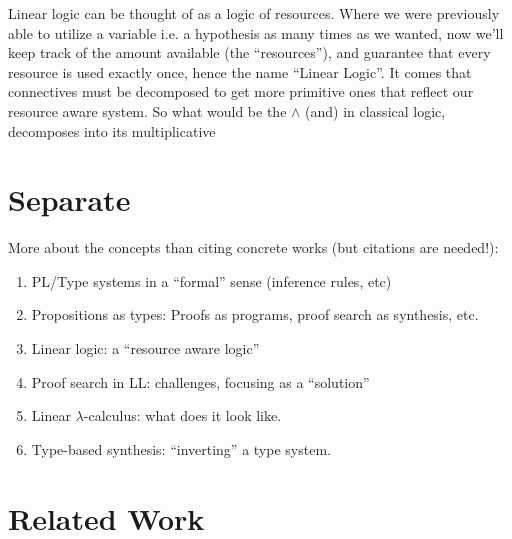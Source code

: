 \documentclass{llncs}
\begin{document}
Linear logic \cite{DBLP:journals/tcs/Girard87} can be thought of as a logic of resources.
Where we were previously able to utilize a variable i.e. a hypothesis as many times as we wanted,
now we'll keep track of the amount available (the ``resources''), and guarantee that every resource is used exactly once, hence the name ``Linear Logic''.
It comes that connectives must be decomposed to get more primitive ones that reflect our resource aware system.
So what would be the $\wedge$ (and) in classical logic, decomposes into its multiplicative 
 


\section{Separate}

More about the concepts than citing concrete works (but citations are
needed!):
\begin{enumerate}
\item PL/Type systems in a ``formal'' sense (inference rules, etc)
\item Propositions as types: Proofs as programs, proof search as
  synthesis, etc.
\item Linear logic: a ``resource aware logic''
\item Proof search in LL: challenges, focusing as a ``solution''
\item Linear $\lambda$-calculus: what does it look like.
\item Type-based synthesis: ``inverting'' a type system.
\end{enumerate}

\section{Related Work}
\end{document}
